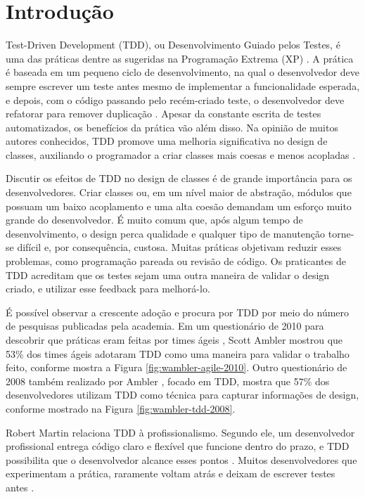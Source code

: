 \chapter{Introdução}
\label{cap:introducao}

Test-Driven Development (TDD), ou Desenvolvimento Guiado pelos Testes,
é uma das práticas dentre as sugeridas na Programação
Extrema (XP) \cite{XPExplained}. A prática é baseada em um pequeno ciclo de
desenvolvimento, na qual o desenvolvedor deve sempre escrever um teste antes
mesmo de implementar a funcionalidade esperada, e depois, com o código
passando pelo recém-criado teste, o desenvolvedor deve refatorar para 
remover duplicação \cite{TDDByExample}.
Apesar da constante escrita de testes automatizados, os benefícios da
prática vão além disso. Na opinião de muitos autores conhecidos, TDD promove
uma melhoria significativa no design de classes, auxiliando o programador a
criar classes mais coesas e menos acopladas \cite{TDDByExample} \cite{GOOS} 
\cite{astels-tdd}.

Discutir os efeitos de TDD no design de classes é de grande importância para os
desenvolvedores.
Criar classes ou, em um nível maior de abstração, módulos que possuam um baixo
acoplamento e uma alta coesão demandam um esforço muito grande do desenvolvedor. 
É muito comum que, após algum tempo de desenvolvimento, o design perca qualidade
e qualquer tipo de manutenção torne-se difícil e, por consequência, custosa.
Muitas práticas objetivam reduzir esses problemas, como programação pareada ou
revisão de código. Os praticantes de TDD acreditam que os testes sejam uma outra
maneira de validar o design criado, e utilizar esse feedback para melhorá-lo.

É possível observar a crescente adoção e procura por TDD
por meio do número de pesquisas publicadas pela academia.
Em um questionário de 2010 para descobrir que práticas eram feitas por times
ágeis \cite{wambler-survey-agile}, Scott Ambler mostrou que 53\% dos times ágeis
adotaram TDD como uma maneira para validar o trabalho feito, conforme mostra a 
Figura \ref{fig:wambler-agile-2010}. Outro questionário de 2008 também realizado por Ambler
\cite{wambler-survey-tdd}, focado em TDD, mostra que 57\% dos desenvolvedores 
utilizam TDD como técnica para capturar informações de design, conforme mostrado
na Figura \ref{fig:wambler-tdd-2008}.

Robert Martin relaciona TDD à profissionalismo. Segundo ele, um desenvolvedor
profissional entrega código claro e flexível que funcione dentro do prazo, e TDD
possibilita que o desenvolvedor alcance esses pontos \cite{martin-profissionalismo}.
Muitos desenvolvedores que experimentam a prática, raramente voltam atrás e deixam
de escrever testes antes \cite{tdd-fearless}. 

